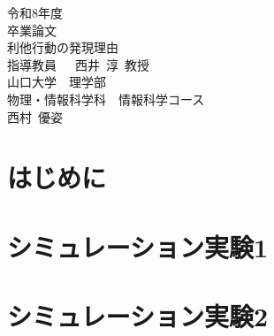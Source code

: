 \documentclass[a4j, 12pt]{jsreport}
\begin{document}
    \begin{titlepage}
        \begin{center}
            \vspace*{1cm}
            \thispagestyle{empty}
            \LARGE {令和8年度}\\
            
            \vspace*{1cm}
            \Huge {卒業論文}\\
            
            \vspace*{2cm}
            \huge {利他行動の発現理由}\\
            
            \vspace*{4cm}
            \LARGE {指導教員~~~西井~淳~教授}\\
            
            \vspace*{1cm}
            \Large {山口大学　理学部\\物理・情報科学科　情報科学コース}\\
            
            \vspace*{0.5cm}
            \LARGE {西村~優姿}
        \end{center}
    \end{titlepage}

    \graphicspath{{img/}}
    
    \setcounter{page}{0}
    \setcounter{tocdepth}{2}
    \tableofcontents
    
    
    \chapter{はじめに}\label{chap:intro}
    \setcounter{page}{1}

    \label{chap1:intro}


    \chapter{シミュレーション実験1}\label{chap2:simu1}
    
    

    \chapter{シミュレーション実験2}\label{chap3:simu2}
    
\end{document}

